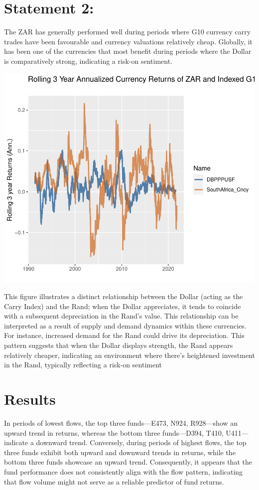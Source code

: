 \documentclass[11pt,preprint, authoryear]{elsarticle}
\numberwithin{equation}{section}
\numberwithin{figure}{section}
\numberwithin{table}{section}
\begin{document}
\hypertarget{statement-2}{%
\section{Statement 2:}\label{statement-2}}

The ZAR has generally performed well during periods where G10 currency
carry trades have been favourable and currency valuations relatively
cheap. Globally, it has been one of the currencies that most benefit
during periods where the Dollar is comparatively strong, indicating a
risk-on sentiment.

\includegraphics{Question-5_files/figure-latex/unnamed-chunk-3-1.pdf}

This figure illustrates a distinct relationship between the Dollar
(acting as the Carry Index) and the Rand; when the Dollar appreciates,
it tends to coincide with a subsequent depreciation in the Rand's value.
This relationship can be interpreted as a result of supply and demand
dynamics within these currencies. For instance, increased demand for the
Rand could drive its depreciation. This pattern suggests that when the
Dollar displays strength, the Rand appears relatively cheaper,
indicating an environment where there's heightened investment in the
Rand, typically reflecting a risk-on sentiment

\hypertarget{results}{%
\section{Results}\label{results}}

In periods of lowest flows, the top three funds---E473, N924,
R928---show an upward trend in returns, whereas the bottom three
funds---D394, T410, U411---indicate a downward trend. Conversely, during
periods of highest flows, the top three funds exhibit both upward and
downward trends in returns, while the bottom three funds showcase an
upward trend. Consequently, it appears that the fund performance does
not consistently align with the flow pattern, indicating that flow
volume might not serve as a reliable predictor of fund returns.

\hfill

\newpage


\end{document}
